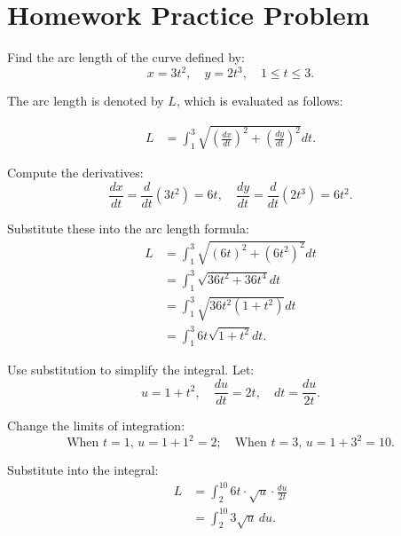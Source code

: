 \documentclass{article}
\begin{document}
\section*{Homework Practice Problem}
\begin{notebox}
    Find the arc length of the curve defined by:
    \[
        x = 3t^2, \quad y = 2t^3, \quad 1 \leq t \leq 3.
    \]

    \begin{solutionbox}
        The arc length is denoted by \( L \), which is evaluated as follows:

    \begin{equation*}
        \begin{aligned}
            L &= \int_{1}^{3} \sqrt{\left(\frac{dx}{dt}\right)^2 + \left(\frac{dy}{dt}\right)^2} dt.
        \end{aligned}
    \end{equation*}

    Compute the derivatives:
    \[
        \frac{dx}{dt} = \frac{d}{dt}(3t^2) = 6t, \quad \frac{dy}{dt} = \frac{d}{dt}(2t^3) = 6t^2.
    \]

    Substitute these into the arc length formula:
    \begin{equation*}
        \begin{aligned}
            L &= \int_{1}^{3} \sqrt{(6t)^2 + (6t^2)^2} dt \\
            &= \int_{1}^{3} \sqrt{36t^2 + 36t^4} dt \\
            &= \int_{1}^{3} \sqrt{36t^2(1 + t^2)} dt \\
            &= \int_{1}^{3} 6t\sqrt{1 + t^2} dt.
        \end{aligned}
    \end{equation*}

    Use substitution to simplify the integral. Let:
    \[
        u = 1 + t^2, \quad \frac{du}{dt} = 2t, \quad dt = \frac{du}{2t}.
    \]

    Change the limits of integration:
    \[
        \text{When } t = 1, \, u = 1 + 1^2 = 2; \quad \text{When } t = 3, \, u = 1 + 3^2 = 10.
    \]

    Substitute into the integral:
    \begin{equation*}
        \begin{aligned}
            L &= \int_{2}^{10} 6t \cdot \sqrt{u} \cdot \frac{du}{2t} \\
            &= \int_{2}^{10} 3\sqrt{u} \, du.
        \end{aligned}
    \end{equation*}
    \end{solutionbox}
\end{notebox}
\end{document}
